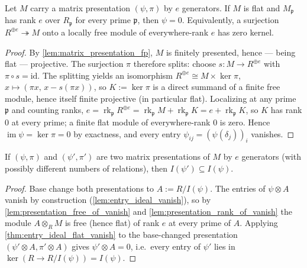 \begin{theorem}
  \label{thm:entry_ideal_flat_vanish}
  \leanok
  Let \(M\) carry a matrix presentation \((\psi, \pi)\) by \(e\) generators.
  If \(M\) is flat and \(M_{\mathfrak p}\) has rank \(e\) over
  \(R_{\mathfrak p}\) for every prime \(\mathfrak p\), then \(\psi = 0\).
  Equivalently, a surjection \(R^{\oplus e} \twoheadrightarrow M\) onto a
  locally free module of everywhere-rank \(e\) has zero kernel.
\end{theorem}

\begin{proof}
  \leanok
  By \cref{lem:matrix_presentation_fp}, \(M\) is finitely presented, hence
  --- being flat --- projective.  The surjection \(\pi\) therefore splits:
  choose \(s : M \to R^{\oplus e}\) with \(\pi \circ s = \mathrm{id}\).
  The splitting yields an isomorphism
  \(R^{\oplus e} \cong M \times \ker \pi\), \(x \mapsto
  (\pi x,\, x - s(\pi x))\), so \(K := \ker \pi\) is a direct summand of a
  finite free module, hence itself finite projective (in particular flat).
  Localizing at any prime \(\mathfrak p\) and counting ranks,
  \(e = \operatorname{rk}_{\mathfrak p} R^{\oplus e}
     = \operatorname{rk}_{\mathfrak p} M + \operatorname{rk}_{\mathfrak p} K
     = e + \operatorname{rk}_{\mathfrak p} K\),
  so \(K\) has rank \(0\) at every prime; a finite flat module of
  everywhere-rank \(0\) is zero.  Hence
  \(\operatorname{im} \psi = \ker \pi = 0\) by exactness, and every entry
  \(\psi_{ij} = (\psi(\delta_j))_i\) vanishes.
\end{proof}

\begin{lemma}
  \label{lem:entry_ideal_le}
  \leanok
  If \((\psi, \pi)\) and \((\psi', \pi')\) are two matrix presentations of
  \(M\) by \(e\) generators (with possibly different numbers of relations),
  then \(I(\psi') \subseteq I(\psi)\).
\end{lemma}

\begin{proof}
  \leanok
  Base change both presentations to \(A := R / I(\psi)\).  The entries of
  \(\psi \otimes A\) vanish by construction
  (\cref{lem:entry_ideal_vanish}), so by
  \cref{lem:presentation_free_of_vanish} and \cref{lem:presentation_rank_of_vanish}
  the module \(A \otimes_R M\) is free (hence flat) of rank \(e\) at every
  prime of \(A\).  Applying \cref{thm:entry_ideal_flat_vanish} to the
  base-changed presentation \((\psi' \otimes A, \pi' \otimes A)\) gives
  \(\psi' \otimes A = 0\), i.e.\ every entry of \(\psi'\) lies in
  \(\ker(R \to R/I(\psi)) = I(\psi)\).
\end{proof}

